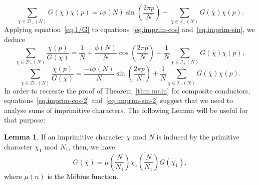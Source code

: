 \documentclass{amsart}
\theoremstyle{definition}
\newtheorem {lemma}[theorem]{Lemma}
\numberwithin{equation}{section}
\begin{document}
\begin{equation}\label{eq.imprim-sin}
\sum_{\chi \in \mathcal D_-(N)} G(\overline{\chi}) \chi(p)
=i\phi(N)\sin \left (
\frac{2 \pi p} N \right )- \sum_{\chi \in \mathcal{I}_-(N)} G(\overline{\chi}) \chi(p).
\end{equation}
Applying equation~\eqref{eq.1/G} to equations~\eqref{eq.imprim-cos} and~\eqref{eq.imprim-sin}, we deduce
\begin{equation}\label{eq.imprim-cos-2}
\sum_{\chi \in \mathcal D_+(N)} \frac{\chi(p)}{G(\chi)}
=\frac{1}{N}+ \frac{\phi(N)}{N}\cos \left (
\frac{2 \pi p} N \right )- \frac{1}{N}\sum_{\chi \in \mathcal{I}_+(N)} G(\overline{\chi}) \chi(p),
\end{equation}
\begin{equation}\label{eq.imprim-sin-2}
\sum_{\chi \in \mathcal D_-(N)} \frac{\chi(p)}{G(\chi)}
=\frac{-i\phi(N)}{N}\sin \left (
\frac{2 \pi p} N \right )+ \frac{1}{N}\sum_{\chi \in \mathcal{I}_-(N)} G(\overline{\chi}) \chi(p).
\end{equation}
In order to recreate the proof of Theorem~\ref{thm.main} for composite conductors, equations~\eqref{eq.imprim-cos-2} and~\eqref{eq.imprim-sin-2} suggest that we need to analyse sums of imprimitive characters. 
The following Lemma will be useful for that purpose:
\begin{lemma}
If an imprimitive character $\chi$ mod $N$ is induced by the primitive character $\chi_1$ mod $N_1$, then,  we have
\begin{equation}\label{eq.imprimGauss}
G(\overline{\chi})=\mu \left({\frac {N}{N_{1}}}\right)\overline{\chi_{1}\left({\frac {N}{N_{1}}}\right)}G\left(\overline{\chi _{1}}\right), 
\end{equation}
where $\mu(n)$ is the M\"obius function.
\end{lemma}
\end{document}
